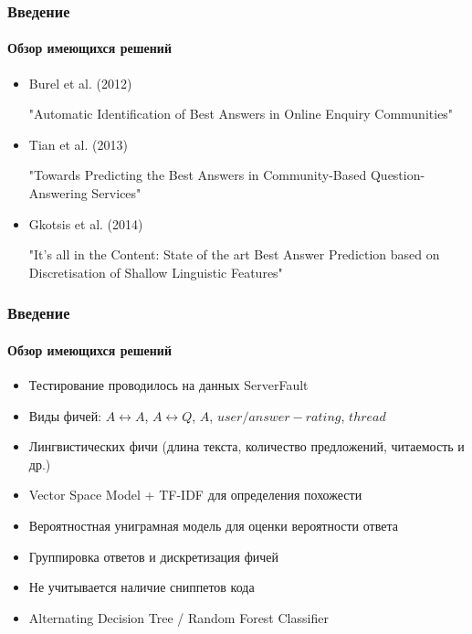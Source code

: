 \documentclass[10pt]{beamer}
\begin{document}

\begin{frame}
\frametitle{Введение}
\framesubtitle{Обзор имеющихся решений}

\begin{itemize}
	\setlength{\itemsep}{1em}

	\item Burel et al. (2012)
	
	"Automatic Identification of Best Answers in Online Enquiry Communities" 

	\item Tian et al. (2013) 
	
	"Towards Predicting the Best Answers in Community-Based Question-Answering Services" 

	\item Gkotsis et al. (2014)
	
	"It’s all in the Content: State of the art Best Answer Prediction based on Discretisation of Shallow Linguistic Features"

\end{itemize}

\end{frame}


\begin{frame}
\frametitle{Введение}
\framesubtitle{Обзор имеющихся решений}

\begin{itemize}
	\item Тестирование проводилось на данных ServerFault
	\item Виды фичей: $A \leftrightarrow A$, $A \leftrightarrow Q$, $A$, $user/answer-rating$, $thread$ 
	\item Лингвистических фичи (длина текста, количество предложений, читаемость и др.)
	\item Vector Space Model + TF-IDF для определения похожести
	\item Вероятностная униграмная модель для оценки вероятности ответа
	\item Группировка ответов и дискретизация фичей
	\item Не учитывается наличие сниппетов кода
	\item Alternating Decision Tree / Random Forest Classifier
\end{itemize}

\end{frame}
\end{document}
